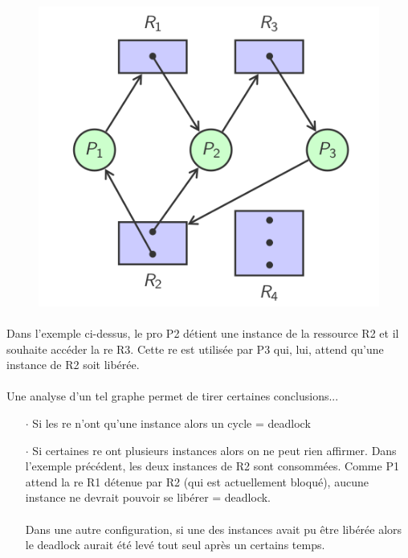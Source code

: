 {\begin{figure}[!h]
\center
\includegraphics[scale=.3]{images/graphe-deadlock}
\end{figure}
\paragraph{}
Dans l'exemple ci-dessus, le pro P2 détient une instance de la ressource R2 et il souhaite accéder la re R3. Cette re est utilisée par P3 qui, lui, attend qu'une instance de R2 soit libérée.
\paragraph{}
Une analyse d'un tel graphe permet de tirer certaines conclusions...
\begin{itemize}
\item[$\cdot$]Si les re n'ont qu'une instance alors un cycle = deadlock
\item[$\cdot$]Si certaines re ont plusieurs instances alors on ne peut rien affirmer. Dans l'exemple précédent, les deux instances de R2 sont consommées. Comme P1 attend la re R1 détenue par R2 (qui est actuellement bloqué), aucune instance ne devrait pouvoir se libérer = deadlock.\paragraph{}Dans une autre configuration, si une des instances avait pu être libérée alors le deadlock aurait été levé tout seul après un certains temps.
\end{itemize}

}
